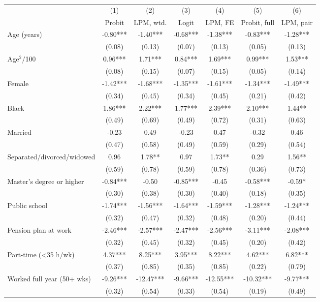 \begin{tabular}{lcccccc}
\toprule
 & (1) & (2) & (3) & (4) & (5) & (6) \\
 & Probit & LPM, wtd. & Logit & LPM, FE & Probit, full & LPM, pair \\
\midrule
Age (years) & -0.80*** & -1.40*** & -0.68*** & -1.38*** & -0.83*** & -1.28*** \\
 & (0.08) & (0.13) & (0.07) & (0.13) & (0.05) & (0.13) \\
Age$^2$/100 & 0.96*** & 1.71*** & 0.84*** & 1.69*** & 0.99*** & 1.53*** \\
 & (0.08) & (0.15) & (0.07) & (0.15) & (0.05) & (0.14) \\
Female & -1.42*** & -1.68*** & -1.35*** & -1.61*** & -1.34*** & -1.49*** \\
 & (0.34) & (0.45) & (0.34) & (0.45) & (0.21) & (0.42) \\
Black & 1.86*** & 2.22*** & 1.77*** & 2.39*** & 2.10*** & 1.44** \\
 & (0.49) & (0.69) & (0.49) & (0.72) & (0.31) & (0.63) \\
Married & -0.23 & 0.49 & -0.23 & 0.47 & -0.32 & 0.46 \\
 & (0.47) & (0.58) & (0.49) & (0.59) & (0.29) & (0.54) \\
Separated/divorced/widowed & 0.96 & 1.78** & 0.97 & 1.73** & 0.29 & 1.56** \\
 & (0.59) & (0.78) & (0.59) & (0.78) & (0.36) & (0.73) \\
Master's degree or higher & -0.84*** & -0.50 & -0.85*** & -0.45 & -0.58*** & -0.59* \\
 & (0.30) & (0.38) & (0.30) & (0.40) & (0.18) & (0.35) \\
Public school & -1.74*** & -1.56*** & -1.64*** & -1.59*** & -1.28*** & -1.24*** \\
 & (0.32) & (0.47) & (0.32) & (0.48) & (0.20) & (0.44) \\
Pension plan at work & -2.46*** & -2.57*** & -2.47*** & -2.56*** & -3.11*** & -2.08*** \\
 & (0.32) & (0.45) & (0.32) & (0.45) & (0.20) & (0.42) \\
Part-time (<35 h/wk) & 4.37*** & 8.25*** & 3.95*** & 8.22*** & 4.62*** & 6.82*** \\
 & (0.37) & (0.85) & (0.35) & (0.85) & (0.22) & (0.79) \\
Worked full year (50+ wks) & -9.26*** & -12.47*** & -9.66*** & -12.55*** & -10.32*** & -9.77*** \\
 & (0.32) & (0.54) & (0.33) & (0.54) & (0.19) & (0.49) \\

\end{tabular}
